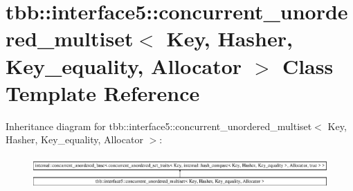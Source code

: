 \hypertarget{classtbb_1_1interface5_1_1concurrent__unordered__multiset}{}\section{tbb\+:\+:interface5\+:\+:concurrent\+\_\+unordered\+\_\+multiset$<$ Key, Hasher, Key\+\_\+equality, Allocator $>$ Class Template Reference}
\label{classtbb_1_1interface5_1_1concurrent__unordered__multiset}
Inheritance diagram for tbb\+:\+:interface5\+:\+:concurrent\+\_\+unordered\+\_\+multiset$<$ Key, Hasher, Key\+\_\+equality, Allocator $>$\+:\begin{figure}[H]
\begin{center}
\leavevmode
\includegraphics[height=1.254199cm]{classtbb_1_1interface5_1_1concurrent__unordered__multiset}
\end{center}
\end{figure}
